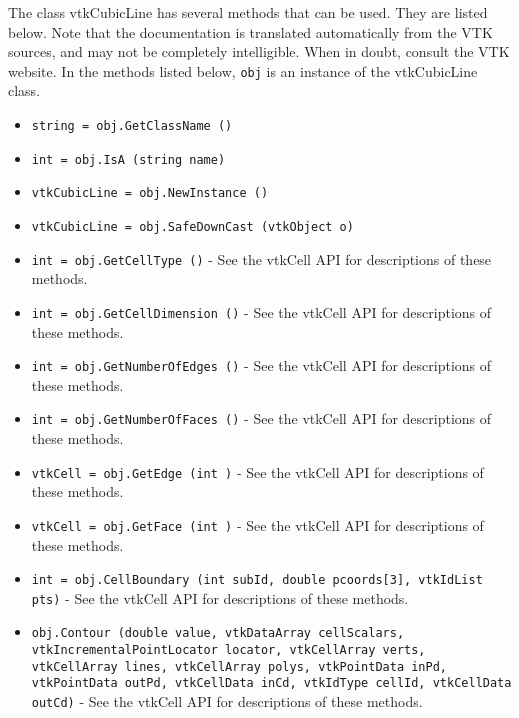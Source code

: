 The class vtkCubicLine has several methods that can be used.
  They are listed below.
Note that the documentation is translated automatically from the VTK sources,
and may not be completely intelligible.  When in doubt, consult the VTK website.
In the methods listed below, \verb|obj| is an instance of the vtkCubicLine class.
\begin{itemize}
\item  \verb|string = obj.GetClassName ()|

\item  \verb|int = obj.IsA (string name)|

\item  \verb|vtkCubicLine = obj.NewInstance ()|

\item  \verb|vtkCubicLine = obj.SafeDownCast (vtkObject o)|

\item  \verb|int = obj.GetCellType ()| -  See the vtkCell API for descriptions of these methods.

\item  \verb|int = obj.GetCellDimension ()| -  See the vtkCell API for descriptions of these methods.

\item  \verb|int = obj.GetNumberOfEdges ()| -  See the vtkCell API for descriptions of these methods.

\item  \verb|int = obj.GetNumberOfFaces ()| -  See the vtkCell API for descriptions of these methods.

\item  \verb|vtkCell = obj.GetEdge (int )| -  See the vtkCell API for descriptions of these methods.

\item  \verb|vtkCell = obj.GetFace (int )| -  See the vtkCell API for descriptions of these methods.

\item  \verb|int = obj.CellBoundary (int subId, double pcoords[3], vtkIdList pts)| -  See the vtkCell API for descriptions of these methods.

\item  \verb|obj.Contour (double value, vtkDataArray cellScalars, vtkIncrementalPointLocator locator, vtkCellArray verts, vtkCellArray lines, vtkCellArray polys, vtkPointData inPd, vtkPointData outPd, vtkCellData inCd, vtkIdType cellId, vtkCellData outCd)| -  See the vtkCell API for descriptions of these methods.


\end{itemize}
